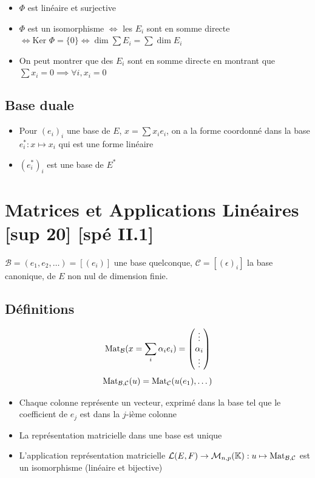 \documentclass[openany]{book}
\begin{document}
\begin{itemize}
    \item $\Phi$ est linéaire et surjective
    \item $\Phi$ est un isomorphisme $\iff$ les $E_i$ sont en somme directe $\iff \text{Ker } \Phi = \{0\} \iff \dim \sum E_i = \sum \dim E_i $
    \item On peut montrer que des $E_i$ sont en somme directe en montrant que $\sum x_i = 0 \implies \forall i, x_i = 0$
\end{itemize}

\subsection{Base duale}
\begin{itemize}
    \item Pour $(e_i)_i$ une base de $E$, $x = \sum x_i e_i$, on a la forme coordonné dans la base $e_i^* : x \mapsto x_i$ qui est une forme linéaire
    \item $(e_i^*)_i$ est une base de $E^*$
\end{itemize}


\clearpage
\section{Matrices et Applications Linéaires [sup 20] [spé II.1]}

$ \mathcal{B} = (e_1, e_2, \dots) = [(e_i)] $ une base quelconque, $ \mathcal{C} = [(\epsilon)_i] $ la base canonique, de $E$ non nul de dimension finie.

\subsection{Définitions}
\[ \text{Mat}_{\mathcal{B}}(x = \sum_i \alpha_i e_i ) = \begin{pmatrix}
    \vdots \\
    \alpha_i \\
    \vdots
\end{pmatrix} \]
\[ \text{Mat}_{\mathcal{B}, \mathcal{C}}(u) = \text{Mat}_{\mathcal{C}}(u(e_1), \dots) \]

\begin{itemize}
    \item Chaque colonne représente un vecteur, exprimé dans la base tel que le coefficient de $e_j$ est dans la $j$-ième colonne
    \item La représentation matricielle dans une base est unique
    \item L'application représentation matricielle $ \mathcal{L}(E, F) \rightarrow \mathcal{M}_{n, p}(\mathbb{K}) : u \mapsto \text{Mat}_{\mathcal{B}, \mathcal{C}} $ est un isomorphisme (linéaire et bijective)
\end{itemize}
\end{document}
